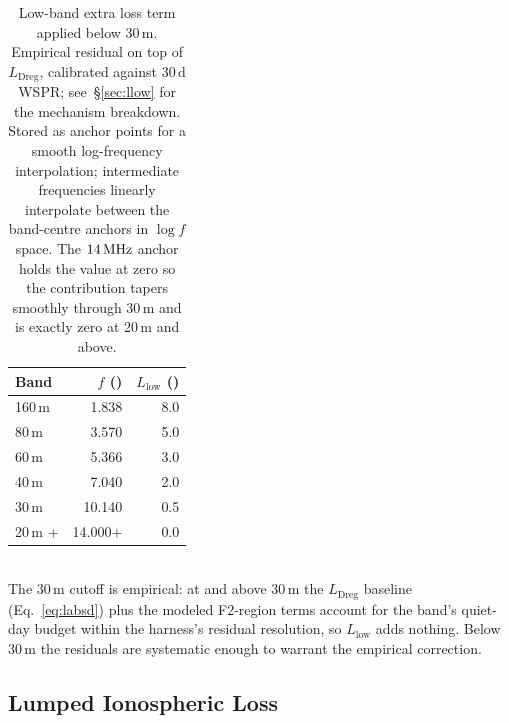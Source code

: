 \documentclass[11pt,a4paper]{article}
\newcommand{\SI}[2]{#1\,\text{#2}}
\newcommand{\si}[1]{\text{#1}}
\newcommand{\dB}{\text{dB}}
\newcommand{\MHz}{\text{MHz}}
\begin{document}
\begin{table}[H]
\centering
\caption{Low-band extra loss term applied below 30\,m.  Empirical
residual on top of $L_{\text{Dreg}}$, calibrated against 30\,d
WSPR; see~\S\ref{sec:llow} for the mechanism breakdown.  Stored as
anchor points for a smooth log-frequency interpolation;
intermediate frequencies linearly interpolate between the
band-centre anchors in $\log f$ space.  The $\SI{14}{\MHz}$ anchor
holds the value at zero so the contribution tapers smoothly
through 30\,m and is exactly zero at 20\,m and above.}
\label{tab:lowbandextra}
\begin{tabular}{@{}lrr@{}}
\toprule
\textbf{Band} & {$f$ (\si{\MHz})} & {$L_{\text{low}}$ (\si{\dB})} \\
\midrule
160\,m & 1.838 & 8.0 \\
80\,m  & 3.570 & 5.0 \\
60\,m  & 5.366 & 3.0 \\
40\,m  & 7.040 & 2.0 \\
30\,m  & 10.140 & 0.5 \\
20\,m + & 14.000+ & 0.0 \\
\bottomrule
\end{tabular}\\[4pt]
\footnotesize
The 30\,m cutoff is empirical: at and above 30\,m the
$L_{\text{Dreg}}$ baseline (Eq.~\ref{eq:labsd}) plus the modeled
F2-region terms account for the band's quiet-day budget within
the harness's residual resolution, so $L_{\text{low}}$ adds
nothing.  Below 30\,m the residuals are systematic enough to
warrant the empirical correction.
\end{table}

\subsection{Lumped Ionospheric Loss}\label{sec:liono}
\end{document}
